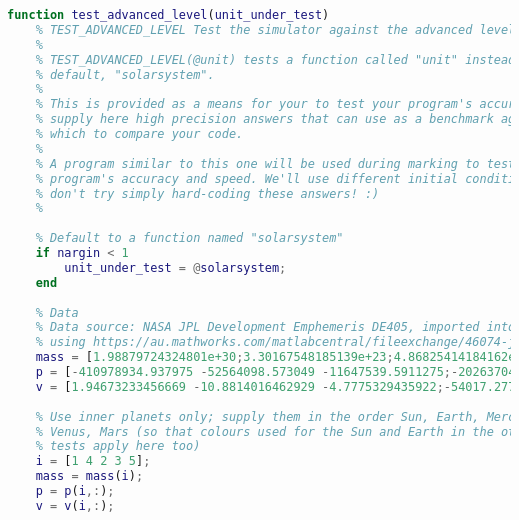 \begin{lstlisting}[language=Matlab, caption={MATLAB Code that tests Solar System Function}]
    function test_advanced_level(unit_under_test)
    % TEST_ADVANCED_LEVEL Test the simulator against the advanced level of achievement.
    %
    % TEST_ADVANCED_LEVEL(@unit) tests a function called "unit" instead of the
    % default, "solarsystem".
    %
    % This is provided as a means for your to test your program's accuracy. We
    % supply here high precision answers that can use as a benchmark against
    % which to compare your code.
    %
    % A program similar to this one will be used during marking to test your
    % program's accuracy and speed. We'll use different initial conditions, so
    % don't try simply hard-coding these answers! :)
    %
    
    % Default to a function named "solarsystem"
    if nargin < 1
        unit_under_test = @solarsystem;
    end
    
    % Data
    % Data source: NASA JPL Development Emphemeris DE405, imported into Matlab
    % using https://au.mathworks.com/matlabcentral/fileexchange/46074-jpl-ephemeris-manager
    mass = [1.98879724324801e+30;3.30167548185139e+23;4.86825414184162e+24;5.97333182929537e+24;6.41814989746695e+23;1.89888757501372e+27;5.68569250232054e+26;8.68357411676561e+25;1.02450682828011e+26;1.47100387814202e+22];
    p = [-410978934.937975 -52564098.573049 -11647539.5911275;-20263704896.5463 37298969437.5484 21998926177.1807;107457059203.846 12751258164.7855 -1081247256.91775;-104473131433.549 95807463843.1787 41554965796.5625;-47532402438.2755 -197479402904.819 -89286739068.5338;740812325977.265 -29623952257.2314 -30753799138.017;-391719672964.493 1189107854643.27 507856891148.711;-2396814857836.84 -1270773906334.37 -522608874439.045;-1545201887440.28 -3957617757444.78 -1581427940931.15;-4371341308972.33 -1084064015240.84 978703610774.062];
    v = [1.94673233456669 -10.8814016462929 -4.7775329435922;-54017.2779417951 -18415.0969798133 -4228.50548119061;-3793.57777814318 31524.0648690534 14419.9306824639;-21597.9402281813 -19392.9951239518 -8410.50277824797;24596.1594690375 -2563.11636886769 -1841.7251251432;538.777252737696 12558.0983493514 5370.16231719295;-9767.15104601119 -2764.87492216388 -721.832483731844;3335.76872430951 -5686.29309895411 -2537.72389267233;5074.99185394443 -1640.69964089467 -797.853610190395;1586.81468930053 -5301.34210829372 -2132.29213550457];
    
    % Use inner planets only; supply them in the order Sun, Earth, Mercury,
    % Venus, Mars (so that colours used for the Sun and Earth in the other
    % tests apply here too)
    i = [1 4 2 3 5];
    mass = mass(i);
    p = p(i,:);
    v = v(i,:);
    

\end{lstlisting}
